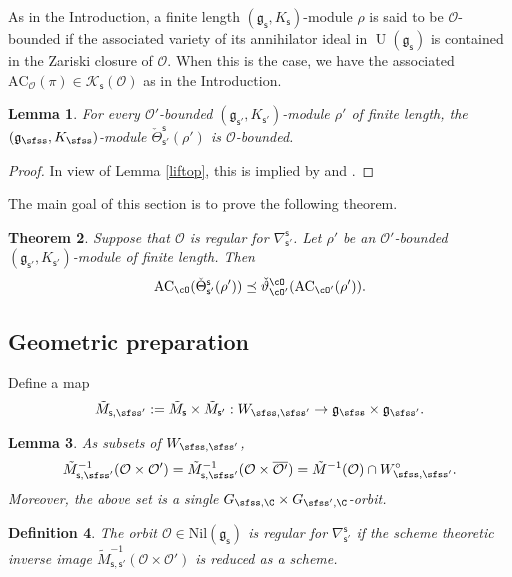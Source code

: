 \documentclass[12pt,a4paper]{amsart}
\newcommand{\CK}{{\mathcal {K}}}
\newcommand{\CO}{{\mathcal {O}}}
\newcommand{\oU}{\operatorname{U}}
\newcommand{\g}{\mathfrak g}
\def\DD{\nabla}
\numberwithin{equation}{section}
\newtheorem{thm}{Theorem}[section]
\newtheorem{lem}[thm]{Lemma}
\newtheorem{defn}[thm]{Definition}
\theoremstyle{remark}
\begin{document}
As in the Introduction, a finite length $(\g_{\mathsf s}, K_{\mathsf s})$-module $\rho$ is said to be $\CO$-bounded if the associated variety of its annihilator ideal in $\oU(\g_\mathsf s)$ is contained in the Zariski closure of $\CO$. When this is the case, we have the associated $\mathrm{AC}_{\CO}(\pi)\in  \CK_{\mathsf s}(\CO)$ as in the Introduction.




\begin{lem}\label{lem:GDS.AC}
  For every 
  $\CO'$-bounded $(\g_{\mathsf s'}, K_{\mathsf s'})$-module  $\rho'$ of finite length, the $(\g_\sfss, K_\sfss)$-module $\check \Theta_{\mathsf s'}^{\mathsf s}(\rho')$ is $\CO$-bounded.  
\end{lem}
\begin{proof}
In view of Lemma \ref{liftop}, this is implied by \cite[Theorem B]{LM} and \cite[Theorem 8.4]{Vo89}.
\end{proof}


The main goal of this section is to  prove the following theorem.

\begin{thm}\label{prop:GDS.AC}
 Suppose that $\CO$ is regular for  $\DD_{\mathsf s'}^{\mathsf s}$. Let $\rho'$ be an 
  $\CO'$-bounded $(\g_{\mathsf s'}, K_{\mathsf s'})$-module  of finite length. Then
    \[
    \mathrm{AC}_{\cO}(\check \Theta_{\mathsf s'}^{\mathsf s}(\rho'))\preceq \check \vartheta_{\cO'}^\cO(\mathrm{AC}_{\cO'}(\rho')).
  \]
\end{thm}




\subsection{Geometric preparation}  

Define a map
\[
   \tilde M_{\mathsf s, \sfss'}:= \tilde M_{\mathsf s}\times \tilde M_{\mathsf s'}: W_{\sfss, \sfss'}\rightarrow \g_\sfss\times \g_{\sfss'}.
\]
\begin{lem}
As subsets of $W_{\sfss, \sfss'}$, 
\[
    \tilde M_{\mathsf s, \sfss'}^{-1}(\CO\times \CO')= \tilde M_{\mathsf s, \sfss'}^{-1}(\CO\times \overline{\CO'}) =\tilde M^{-1}(\CO)\cap W_{\sfss, \sfss'}^\circ.
    \]
Moreover, the above set is a single $G_{\sfss, \C}\times G_{\sfss',\C}$-orbit. 
\end{lem}


\begin{defn}
The orbit $\CO\in \mathrm{Nil}(\g_\mathsf s)$ is regular for $\DD_{\mathsf s'}^{\mathsf s}$ if the scheme theoretic inverse image $\tilde M_{\mathsf s, \mathsf s'}^{-1}(\CO\times \CO')$ is reduced as a scheme. 
\end{defn}
\end{document}
